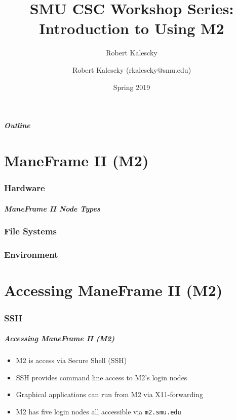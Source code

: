 \documentclass{beamer}
\title{SMU CSC Workshop Series: Introduction to Using M2}
\author{Robert Kalescky}
\date{Spring 2019}
\author{Robert Kalescky (rkalescky@smu.edu)}
\begin{document}
\begin{frame}
\titlepage
\end{frame}

\begin{frame}
\frametitle{Outline}
\tableofcontents
\end{frame}



\part{ManeFrame II (M2)}

\section{Hardware}

\begin{frame}
\frametitle{ManeFrame II Node Types}

\end{frame}

\section{File Systems}

\section{Environment}

\part{Accessing ManeFrame II (M2)}

\section{SSH}

\begin{frame}
\frametitle{Accessing ManeFrame II (M2)}
\begin{itemize}
\item M2 is access via Secure Shell (SSH)
\item SSH provides command line access to M2's login nodes
\item Graphical applications can run from M2 via X11-forwarding
\item M2 has five login nodes all accessible via \texttt{m2.smu.edu}
\end{itemize}
\end{frame}
\end{document}
